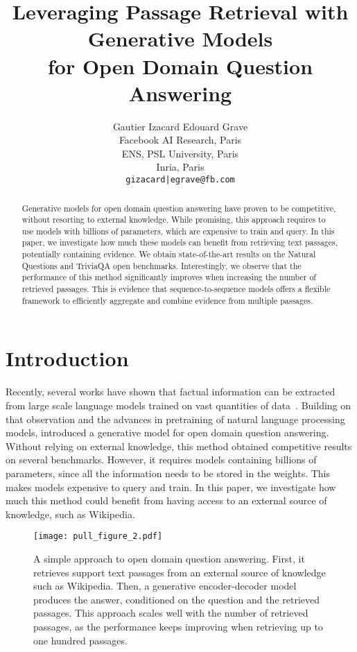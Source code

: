 \documentclass[11pt,a4paper]{article}
\title{{L}everaging Passage Retrieval with Generative Models \\ for Open Domain Question Answering}
\author{
  Gautier Izacard \hspace{2em} Edouard Grave \\
   Facebook AI Research, Paris \\
   ENS, PSL University, Paris \\
   Inria, Paris \\
  \texttt{gizacard|egrave@fb.com} \\
}
\date{}
\begin{document}
 \maketitle
\begin{abstract}
Generative models for open domain question answering have proven to be competitive, without resorting to external knowledge.
While promising, this approach requires to use models with billions of parameters, which are expensive to train and query.
In this paper, we investigate how much these models can benefit from retrieving text passages, potentially containing evidence.
We obtain state-of-the-art results on the Natural Questions and TriviaQA open benchmarks.
Interestingly, we observe that the performance of this method significantly improves when increasing the number of retrieved passages.
This is evidence that sequence-to-sequence models offers a flexible framework to efficiently aggregate and combine evidence from multiple passages.
\end{abstract}

\section{Introduction}
Recently, several works have shown that factual information can be extracted from large scale language models trained on vast quantities of data~\citep{radford2019language,petroni2019language,jiang2019can,talmor2019olmpics}.
Building on that observation and the advances in pretraining of natural language processing models, \citet{roberts2020much} introduced a generative model for open domain question answering.
Without relying on external knowledge, this method obtained competitive results on several benchmarks.
However, it requires models containing billions of parameters, since all the information needs to be stored in the weights.
This makes models expensive to query and train.
In this paper, we investigate how much this method could benefit from having access to an external source of knowledge, such as Wikipedia.

\begin{figure}[t]
\begin{center} 
\texttt{[image: pull\_figure\_2.pdf]}
\vspace{1em}

\caption{A simple approach to open domain question answering.
First, it retrieves support text passages from an external source of knowledge such as Wikipedia.
Then, a generative encoder-decoder model produces the answer, conditioned on the question and the retrieved passages.
This approach scales well with the number of retrieved passages, as the performance keeps improving when retrieving up to one hundred passages.
}
\label{fig:pullfigure}
\end{center}
\end{figure}
\end{document}
